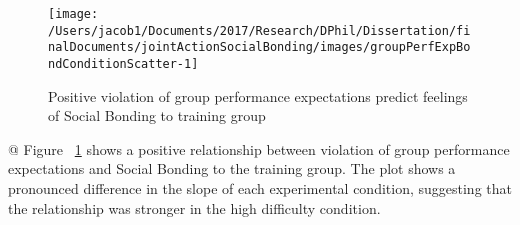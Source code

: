 \documentclass[english]{article}\usepackage[]{graphicx}\usepackage[]{color}
\makeatletter
\def\maxwidth{ %
  \ifdim\Gin@nat@width>\linewidth
    \linewidth
  \else
    \Gin@nat@width
  \fi
}
\newenvironment{kframe}{%
 \def\at@end@of@kframe{}%
 \ifinner\ifhmode%
  \def\at@end@of@kframe{\end{minipage}}%
  \begin{minipage}{\columnwidth}%
 \fi\fi%
 \def\FrameCommand##1{\hskip\@totalleftmargin \hskip-\fboxsep
 \colorbox{shadecolor}{##1}\hskip-\fboxsep
     \hskip-\linewidth \hskip-\@totalleftmargin \hskip\columnwidth}%
 \MakeFramed {\advance\hsize-\width
   \@totalleftmargin\z@ \linewidth\hsize
   \@setminipage}}%
 {\par\unskip\endMakeFramed%
 \at@end@of@kframe}
\newenvironment{knitrout}{}{} %
\makeatother
\begin{document}
\begin{knitrout}
\color{fgcolor}\begin{kframe}


{\ttfamily\noindent\itshape\color{messagecolor}{\#\# Saving 3.5 x 3.5 in image}}

{\ttfamily\noindent\color{warningcolor}{\#\# Warning: Removed 1 rows containing non-finite values (stat\_smooth).}}

{\ttfamily\noindent\color{warningcolor}{\#\# Warning: Removed 1 rows containing missing values (geom\_point).}}

{\ttfamily\noindent\color{warningcolor}{\#\# Warning: Removed 1 rows containing non-finite values (stat\_smooth).}}

{\ttfamily\noindent\color{warningcolor}{\#\# Warning: Removed 1 rows containing missing values (geom\_point).}}\end{kframe}\begin{figure}

{\centering \texttt{[image: /Users/jacob1/Documents/2017/Research/DPhil/Dissertation/finalDocuments/jointActionSocialBonding/images/groupPerfExpBondConditionScatter-1]} 

}

\caption[Positive violation of group performance expectations 
 predict feelings of Social Bonding to training group]{Positive violation of group performance expectations 
 predict feelings of Social Bonding to training group}\label{fig:groupPerfExpBondConditionScatter}
\end{figure}


\end{knitrout}

@
Figure ~\ref{fig:groupPerfExpBondConditionScatter} shows a positive relationship between violation of group performance expectations and Social Bonding to the training group.  The plot shows a pronounced difference in the slope of each experimental condition, suggesting that the relationship was stronger in the high difficulty condition.
\end{document}
